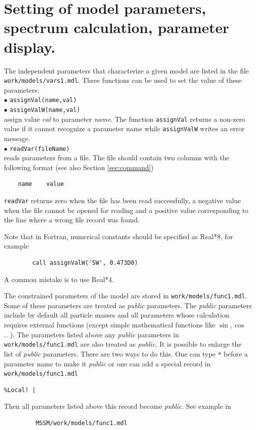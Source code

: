 \documentclass[12pt,a4paper]{article}
\begin{document}
\section{Setting of model parameters, spectrum calculation, parameter display.}
\label{setting_parameters}
The independent parameters that characterize a given model are listed in 
the file \\
\noindent
\verb|work/models/vars1.mdl|. Three functions can be used to set the
value of these parameters:\\

\noindent
$\bullet$ \verb|assignVal(name,val)|\\
$\bullet$ \verb|assignValW(name,val)|\\
assign value {\it val} to parameter {\it name}. The function  \verb|assignVal| returns a non-zero
value  if it
cannot recognize  a parameter name while \verb|assignValW| writes an error message.  \\
$\bullet$ \verb|readVar(fileName)|\\
reads parameters from a file. The file  should contain two columns with the 
 following  format (see also Section \ref{sec:command})
\begin{verbatim}
    name    value
\end{verbatim}
\verb|readVar| returns zero when
the file has been read successfully, a negative value when the
file cannot be opened for reading and  a positive  value 
corresponding to the line where a wrong file record was found.

Note that in  Fortran, numerical constants should be specified as  Real*8, for example
\begin{verbatim}     
        call assignValW('SW', 0.473D0) 
\end{verbatim}
A common mistake is to use Real*4.  


The constrained parameters of the model are stored in \verb|work/models/func1.mdl|. Some of
these parameters are treated as {\it public} parameters. The {\it public} parameters include 
by default all particle masses 
and all parameters  whose calculation requires external functions (except simple
mathematical functions like $\sin,\cos$ .. ). The parameters
listed above any {\it public} parameters in  \verb|work/models/func1.mdl|
are also treated as {\it public}. 
It is possible to enlarge the list of {\it public} parameters. There are two ways to do this. 
One can type \verb|*| before a parameter name to make it {\it public} or one 
can add a  special record in \verb|work/models/func1.mdl|
\begin{verbatim}
%Local! |   
\end{verbatim}
Then all parameters listed above this record  become {\it public}. 
See example in
\begin{verbatim} 
         MSSM/work/models/func1.mdl 
\end{verbatim}
\end{document}
